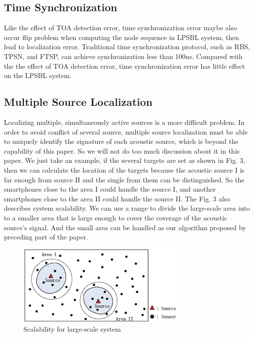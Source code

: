 \subsection{Time Synchronization }

Like the effect of TOA detection error, time synchronization error maybe also occur flip problem when computing the node sequence in LPSBL system, then lead to localization error.
Traditional time synchronization protocol, such as RBS, TPSN, and FTSP, can achieve synchronization less than 100ns. 
Compared with the the effect of TOA detection error, time synchronization error has little effect on the LPSBL system.

\subsection{Multiple Source Localization}

Localizing multiple, simultaneously active sources is a more difficult problem. 
In order to avoid conflict of several source, multiple source localization must be able to uniquely identify the signature of each acoustic source, which is beyond the capability of this paper. 
So we will not do too much discussion about it in this paper.
We just take an example, if the several targets are set as shown in Fig. 3, then we can calculate the location of the targets 
because the acoustic source I is far enough from source II and the single from them can be distinguished. 
So the smartphones close to the area I could handle the source I, and another smartphones close to the area II could handle the source II. 
The Fig. 3 also describes system scalability.
We can use a range to divide the large-scale area into to a smaller area that is large enough to cover the coverage of the acoustic source's signal.
And the small area can be handled as our algorithm proposed by preceding part of the paper.

  \begin{figure}[ht]
            \setlength{\abovecaptionskip}{0pt}
            \centering
            \includegraphics[scale=1.4,height=4.0cm]{image/fig3.eps}
             \vspace{1mm}
			\caption{Scalability for large-scale system}
			\label{Fig3}
            \label{multiple_source_localization}
            \vspace{-5mm}
  \end{figure}


